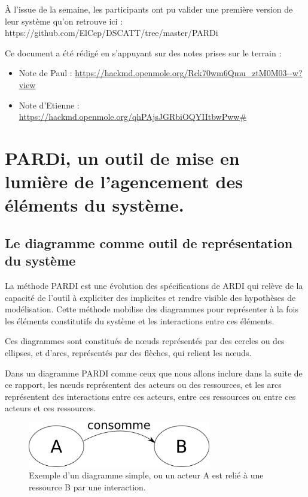 À l'issue de la semaine, les participants ont pu valider une première version de leur système qu'on retrouve ici : https://github.com/ElCep/DSCATT/tree/master/PARDi

Ce document a été rédigé en s'appuyant sur des notes prises sur le terrain :
\begin{itemize}
  \item Note de Paul : \url{https://hackmd.openmole.org/Rck70wm6Qmu_ztM0M03--w?view}
  \item Note d'Etienne : \url{https://hackmd.openmole.org/qhPAjsJGRbiOQYIItbwPww#}
\end{itemize}


\section{PARDi, un outil de mise en lumière de l'agencement des éléments du système.}

\subsection{Le diagramme comme outil de représentation du système}

La méthode PARDI est une évolution des spécifications de ARDI\cite{etienne_ardi_2011} qui relève de la capacité de l'outil à expliciter des implicites et rendre visible des hypothèses de modélisation. Cette méthode mobilise des diagrammes pour représenter à la fois les éléments constitutifs du système et les interactions entre ces éléments.

Ces diagrammes sont constitués de nœuds représentés par des cercles ou des ellipses, et d'arcs, représentés par des flèches, qui relient les nœuds.

Dans un diagramme PARDI comme ceux que nous allons inclure dans la suite de ce rapport, les nœuds représentent des acteurs ou des ressources, et les arcs représentent des interactions entre ces acteurs, entre ces ressources ou entre ces acteurs et ces ressources.

\begin{figure}[h!]
  \begin{center}
    \includegraphics[width=8cm]{img/diagramme_simple.png}
  \end{center}
  \caption{Exemple d'un diagramme simple, ou un acteur A est relié à une ressource B par une interaction.}
  \label{simple_interac}
\end{figure}


